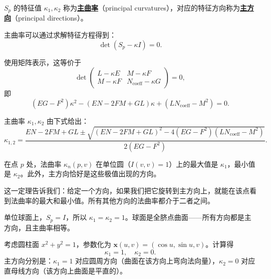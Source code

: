 \begin{Definition}\label{def:principal-curvatures}
$S_p$ 的特征值 $\kappa_1, \kappa_2$ 称为\textbf{\underline{主曲率}}（principal curvatures），对应的特征方向称为\textbf{\underline{主方向}}（principal directions）。
\end{Definition}

主曲率可以通过求解特征方程得到：
\[
\det(S_p - \kappa I) = 0.
\tag{3-3-4}
\]

使用矩阵表示，这等价于
\[
\det\begin{pmatrix} L - \kappa E & M - \kappa F \\ M - \kappa F & N_{\text{coeff}} - \kappa G \end{pmatrix} = 0,
\tag{3-3-5}
\]
即
\[
(EG - F^2)\kappa^2 - (EN - 2FM + GL)\kappa + (LN_{\text{coeff}} - M^2) = 0.
\tag{3-3-6}
\]

\begin{Proposition}[主曲率的显式公式]\label{prop:principal-curvature-explicit}
主曲率 $\kappa_1, \kappa_2$ 由下式给出：
\[
\kappa_{1,2} = \frac{EN - 2FM + GL \pm \sqrt{(EN - 2FM + GL)^2 - 4(EG - F^2)(LN_{\text{coeff}} - M^2)}}{2(EG - F^2)}.
\tag{3-3-7}
\]
\end{Proposition}

\begin{Theorem}[主曲率是最值]\label{th:principal-curvature-extrema}
在点 $p$ 处，法曲率 $\kappa_n(p, v)$ 在单位圆（$I(v,v)=1$）上的最大值是 $\kappa_1$，最小值是 $\kappa_2$。此外，主方向恰好是这些极值出现的方向。
\end{Theorem}

这一定理告诉我们：给定一个方向，如果我们把它旋转到主方向上，就能在该点看到法曲率的最大和最小值。所有其他方向的法曲率都介于二者之间。

\begin{Example}[球面的主曲率]\label{ex:sphere-principal}
单位球面上，$S_p = I$，所以 $\kappa_1 = \kappa_2 = 1$。球面是全脐点曲面——所有方向都是主方向，且主曲率相等。
\end{Example}

\begin{Example}[圆柱面的主曲率]\label{ex:cylinder-principal}
考虑圆柱面 $x^2 + y^2 = 1$，参数化为 $\mathbf{x}(u,v) = (\cos u, \sin u, v)$。计算得
\[
\kappa_1 = 1,\quad \kappa_2 = 0.
\tag{3-3-8}
\]
主方向分别是：$\kappa_1 = 1$ 对应圆周方向（曲面在该方向上弯向法向量），$\kappa_2 = 0$ 对应直母线方向（该方向上曲面是平直的）。
\end{Example}

